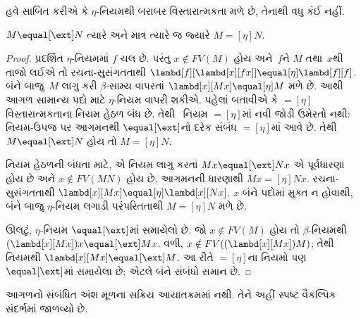 હવે સાબિત કરીએ કે $\eta$-નિયમથી બરાબર વિસ્તારાત્મકતા
મળે છે, તેનાથી વધુ કંઈ નહીં.

\begin{thm}
  $M \equal[\ext] N$ ત્યારે અને માત્ર ત્યારે જ જ્યારે
  $M \equal[\eta] N$.
\end{thm}

\begin{proof}
  પ્રદર્શિત $\eta$-નિયમમાં $f$ ચલ છે. પરંતુ
  $x \notin FV(M)$ હોય અને~$f$ને $M$ તથા~$x$થી
  તાજો લઈએ તો રચના-સુસંગતતાથી
  $\lambd[f][\lambd[x][f x]] \equal[\eta]
  \lambd[f][f]$. બંને બાજુ~$M$ લાગુ કરી
  $\beta$-સામ્ય વાપરતાં $\lambd[x][Mx]
  \equal[\eta] M$ મળે છે. આથી આગળ સામાન્ય પદો માટે
  $\eta$-નિયમ વાપરી શકીએ.
  પહેલાં બતાવીએ કે $\equal[\eta]$ વિસ્તારાત્મકતાના
  નિયમ હેઠળ બંધ છે. તેથી~\ext{} નિયમ
  $\equal[\eta]$માં નવી જોડી ઉમેરતો નથી: નિયમ-ઉપજ
  પર આગમનથી $\equal[\ext]$નો દરેક સંબંધ
  $\equal[\eta]$માં આવે છે. તેથી
  $M \equal[\ext] N$ હોય તો $M \equal[\eta] N$.

  \ext{} નિયમ હેઠળની બંધતા માટે, એ નિયમ લાગુ કરતાં
  $Mx \equal[\ext] Nx$ એ પૂર્વધારણા હોય છે અને
  $x \notin FV(MN)$ હોય છે. આગમનની ધારણાથી
  $Mx \equal[\eta] Nx$. રચના-સુસંગતતાથી
  $\lambd[x][Mx] \equal[\eta] \lambd[x][Nx]$.
  $x$ બંને પદોમાં મુક્ત ન હોવાથી, બંને બાજુ
  $\eta$-નિયમ લગાડી પરંપરિતતાથી
  $M \equal[\eta] N$ મળે છે.

  ઊલટું, $\eta$-નિયમ $\equal[\ext]$માં સમાયેલો છે.
  જો $x \notin FV(M)$ હોય તો $\beta$-નિયમથી
  $(\lambd[x][Mx])x \equal[\ext] Mx$. વળી,
  $x \notin FV((\lambd[x][Mx])M)$; તેથી
  \ext{} નિયમથી $\lambd[x][Mx] \equal[\ext] M$.
  આ રીતે
  $\equal[\eta]$ના નિયમો પણ $\equal[\ext]$માં
  સમાયેલા છે; એટલે બંને સંબંધો સમાન છે.
\end{proof}
\endgroup


\OLEndChapterHook


\begin{editorial}
આગળનો સંબંધિત અંશ મૂળના સક્રિય આયાતક્રમમાં નથી. તેને અહીં સ્પષ્ટ વૈકલ્પિક સંદર્ભમાં જાળવ્યો છે.
\end{editorial}
\begingroup
\makeatletter{}\makeatother

